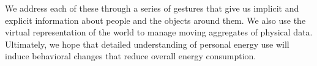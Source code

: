 

  





We address each of these through a series of gestures that give us implicit and explicit information about people
and the objects around them.  We also use the virtual representation of the world to manage moving aggregates of
physical data.
Ultimately, we hope that detailed understanding of personal energy use will induce behavioral changes that reduce
overall energy consumption.


